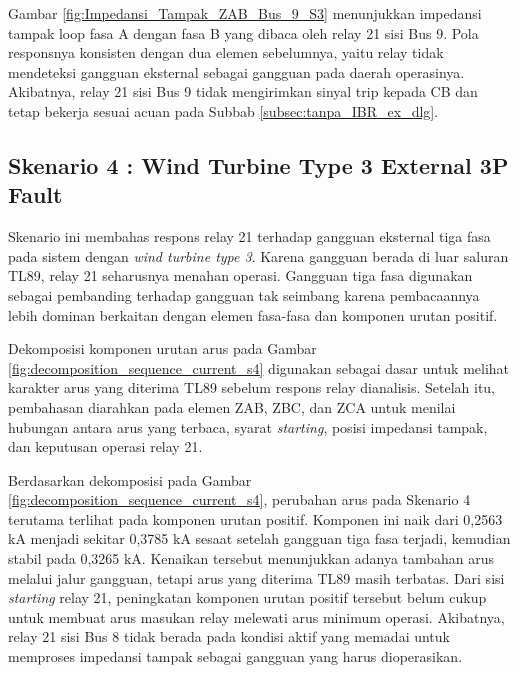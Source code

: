 Gambar \ref{fig:Impedansi_Tampak_ZAB_Bus_9_S3} menunjukkan impedansi tampak loop fasa A dengan fasa B yang dibaca oleh relay 21 sisi Bus 9. Pola responsnya konsisten dengan dua elemen sebelumnya, yaitu relay tidak mendeteksi gangguan eksternal sebagai gangguan pada daerah operasinya. Akibatnya, relay 21 sisi Bus 9 tidak mengirimkan sinyal trip kepada CB dan tetap bekerja sesuai acuan pada Subbab \ref{subsec:tanpa_IBR_ex_dlg}.





\subsection{Skenario 4 : Wind Turbine Type 3 External 3P Fault}

Skenario ini membahas respons relay 21 terhadap gangguan eksternal tiga fasa pada sistem dengan \textit{wind turbine type 3}. Karena gangguan berada di luar saluran TL89, relay 21 seharusnya menahan operasi. Gangguan tiga fasa digunakan sebagai pembanding terhadap gangguan tak seimbang karena pembacaannya lebih dominan berkaitan dengan elemen fasa-fasa dan komponen urutan positif.

Dekomposisi komponen urutan arus pada Gambar \ref{fig:decomposition_sequence_current_s4} digunakan sebagai dasar untuk melihat karakter arus yang diterima TL89 sebelum respons relay dianalisis. Setelah itu, pembahasan diarahkan pada elemen ZAB, ZBC, dan ZCA untuk menilai hubungan antara arus yang terbaca, syarat \textit{starting}, posisi impedansi tampak, dan keputusan operasi relay 21.

Berdasarkan dekomposisi pada Gambar \ref{fig:decomposition_sequence_current_s4}, perubahan arus pada Skenario 4 terutama terlihat pada komponen urutan positif. Komponen ini naik dari 0,2563 kA menjadi sekitar 0,3785 kA sesaat setelah gangguan tiga fasa terjadi, kemudian stabil pada 0,3265 kA. Kenaikan tersebut menunjukkan adanya tambahan arus melalui jalur gangguan, tetapi arus yang diterima TL89 masih terbatas. Dari sisi \textit{starting} relay 21, peningkatan komponen urutan positif tersebut belum cukup untuk membuat arus masukan relay melewati arus minimum operasi. Akibatnya, relay 21 sisi Bus 8 tidak berada pada kondisi aktif yang memadai untuk memproses impedansi tampak sebagai gangguan yang harus dioperasikan.

